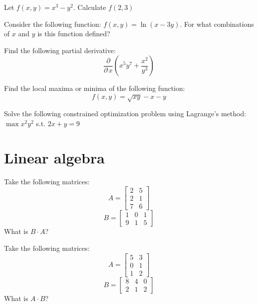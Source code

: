 \documentclass[10pt]{article}
\newenvironment{problem}[2][Problem]{\begin{trivlist}
\item[\hskip \labelsep {\bfseries #1}\hskip \labelsep {\bfseries #2.}]}{\end{trivlist}}
\begin{document}
\begin{problem}{3.8}
Let $f(x,y)=x^3-y^2$. Calculate $f(2,3)$
\end{problem}

\begin{problem}{3.9}
Consider the following function: $f(x,y)=\ln(x-3y)$. For what combinations of $x$ and $y$ is this function defined?
\end{problem}

\begin{problem}{3.10}
Find the following partial derivative:
$$\frac{\partial}{\partial \, x} \left(x^5y^7+\frac{x^2}{y^3}\right)$$
\end{problem}

\begin{problem}{3.11}
Find the local maxima or minima of the following function:
$$f(x,y)=\sqrt{xy}-x-y$$
\end{problem}

\begin{problem}{3.12}
Solve the following constrained optimization problem using Lagrange's method:
$\max x^2y^2$ s.t. $2x+y=9$
\end{problem}

\section{Linear algebra}

\begin{problem}{4.1}
Take the following matrices:
$$A=\begin{bmatrix} 2 & 5\\ 2 & 1 \\ 7 & 6\end{bmatrix}$$
$$B=\begin{bmatrix} 1 & 0 & 1\\9 & 1 & 5\end{bmatrix}$$
What is $B \cdot A$?
\end{problem}

\begin{problem}{4.2}
Take the following matrices:
$$A=\begin{bmatrix} 5 & 3\\ 0 & 1 \\ 1 & 2\end{bmatrix}$$
$$B=\begin{bmatrix} 8 & 4 & 0\\2 & 1 & 2\end{bmatrix}$$
What is $A \cdot B$?
\end{problem}
\end{document}
